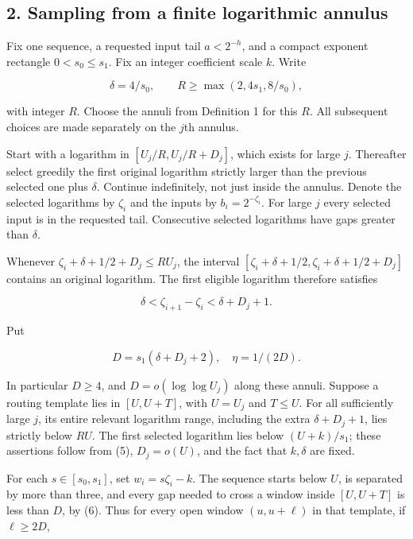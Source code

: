 \documentclass[
  11pt,
]{article}
\begin{document}
\subsection{2. Sampling from a finite logarithmic
annulus}\label{sampling-from-a-finite-logarithmic-annulus}

Fix one sequence, a requested input tail \(a<2^{-h}\), and a compact
exponent rectangle \(0<s_0\le s_1\). Fix an integer coefficient scale
\(k\). Write

\[
 \delta=4/s_0,\qquad R\ge\max(2,4s_1,8/s_0),              \tag{5}
\]

with integer \(R\). Choose the annuli from Definition 1 for this \(R\).
All subsequent choices are made separately on the \(j\)th annulus.

Start with a logarithm in \([U_j/R,U_j/R+D_j]\), which exists for large
\(j\). Thereafter select greedily the first original logarithm strictly
larger than the previous selected one plus \(\delta\). Continue
indefinitely, not just inside the annulus. Denote the selected
logarithms by \(\zeta _i\) and the inputs by \(b_i=2^{-\zeta _i}\). For
large \(j\) every selected input is in the requested tail. Consecutive
selected logarithms have gaps greater than \(\delta\).

Whenever \(\zeta _i+\delta +1/2+D_j\le RU_j\), the interval
\([\zeta _i+\delta +1/2,\zeta _i+\delta +1/2+D_j]\) contains an original
logarithm. The first eligible logarithm therefore satisfies

\[
 \delta<\zeta_{i+1}-\zeta_i<\delta+D_j+1.                 \tag{6}
\]

Put

\[
 D=s_1(\delta+D_j+2),\quad \eta=1/(2D).                    \tag{7}
\]

In particular \(D\ge 4\), and \(D=o(\log\log  U_j)\) along these annuli.
Suppose a routing template lies in \([U,U+T]\), with \(U=U_j\) and
\(T\le U\). For all sufficiently large \(j\), its entire relevant
logarithm range, including the extra \(\delta +D_j+1\), lies strictly
below \(RU\). The first selected logarithm lies below \((U+k)/s_1\);
these assertions follow from (5), \(D_j=o(U)\), and the fact that
\(k,\delta\) are fixed.

For each \(s\in [s_0,s_1]\), set \(w_i=s\zeta _i-k\). The sequence
starts below \(U\), is separated by more than three, and every gap
needed to cross a window inside \([U,U+T]\) is less than \(D\), by (6).
Thus for every open window \((u,u+\ell )\) in that template, if
\(\ell \ge 2D\),
\end{document}
